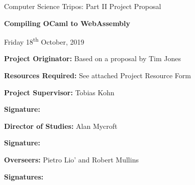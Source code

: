 \thispagestyle{empty}
	
	\medskip
	\medskip
	
	\vfil
	
	\centerline{\large Computer Science Tripos: Part II Project Proposal}
	\vspace{0.4in}
	\centerline{\Large\bf Compiling OCaml to WebAssembly}
	\vspace{0.3in}
	\centerline{\large{Friday 18\textsuperscript{th} October, 2019}}
	
	\vfil
	
	{\bf Project Originator:} Based on a proposal by Tim Jones
	
	\vspace{0.1in}
	
	{\bf Resources Required:} See attached Project Resource Form
	
	\vspace{0.5in}
	
	{\bf Project Supervisor:} Tobias Kohn
	
	\vspace{0.2in}
	
	{\bf Signature:}
	
	\vspace{0.5in}
	
	{\bf Director of Studies:}  Alan Mycroft
	
	\vspace{0.2in}
	
	{\bf Signature:}
	
	\vspace{0.5in}
	
	{\bf Overseers:} Pietro Lio' and Robert Mullins
	
	\vspace{0.2in}
	
	{\bf Signatures:} 
	
	\vfil
	\eject
	
	
